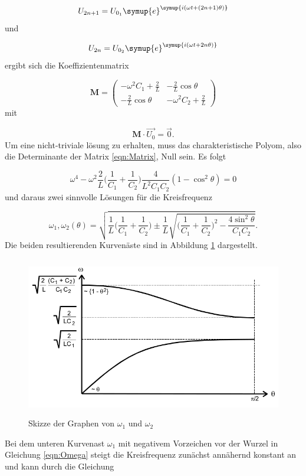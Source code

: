 \begin{equation}
  U_{2n+1} = U_{0_1} \symup{e}^{\symup{i(\omega t + (2n+1)\theta)}}
\end{equation}
und

\begin{equation}
  U_{2n} = U_{0_2} \symup{e}^{\symup{i(\omega t + 2n\theta)}}
\end{equation}
ergibt sich die Koeffizientenmatrix

\begin{equation}
  \symbf{M} =
  \begin{pmatrix}
    -\omega^2 C_1 + \frac{2}{L} & -\frac{2}{L} \cos \theta \\
    -\frac{2}{L} \cos \theta & -\omega^2 C_2 + \frac{2}{L}
  \end{pmatrix}
  \label{eqn:Matrix}
\end{equation}
mit

\begin{equation}
  \symbf{M} \cdot \vec{U_0} = \vec{0}.
\end{equation}
Um eine nicht-triviale lösung zu erhalten, muss das charakteristische Polyom,
also die Determinante der Matrix \eqref{eqn:Matrix}, Null sein.
Es folgt

\begin{equation}
  \omega^4 - \omega^2 \frac{2}{L} \biggl(\frac{1}{C_1} + \frac{1}{C_2}\biggr)
  \frac{4}{L^2 C_1 C_2} (1 - \cos^2 \theta) = 0
\end{equation}
und daraus zwei sinnvolle Lösungen für die Kreisfrequenz \omega

\begin{equation}
  \omega_1, \omega_2 (\theta) = \sqrt{\frac{1}{L} \biggl(\frac{1}{C_1} +
  \frac{1}{C_2}\biggr)
  \pm \frac{1}{L} \sqrt{\biggl(\frac{1}{C_1} + \frac{1}{C_2}\biggr)^2 -
  \frac{4 \sin^2 \theta}{C_1C_2}}}.
  \label{eqn:Omega}
\end{equation}
Die beiden resultierenden Kurvenäste sind in Abbildung \ref{fig:KurveLC1C2}
dargestellt.

\begin{figure}
  \centering
  \includegraphics[height=7cm]{KurveLC1C2.png}
  \caption{Skizze der Graphen von $\omega_1$ und $\omega_2$}
  \label{fig:KurveLC1C2}
\end{figure}
Bei dem unteren Kurvenast $\omega_1$ mit negativem Vorzeichen vor der Wurzel
in Gleichung \eqref{eqn:Omega}
steigt die Kreisfrequenz zunächst annähernd konstant an und kann durch die
Gleichung


